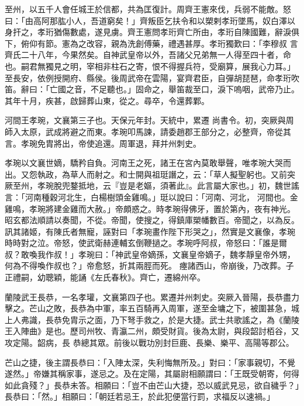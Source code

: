 \begin{pinyinscope}
 至州，以五千人會任城王於信都，共為匡復計。周齊王憲來伐，兵弱不能敵。怒曰：「由高阿那肱小人，吾道窮矣！」齊叛臣乞扶令和以槊剌孝珩墜馬，奴白澤以身扞之，孝珩猶傷數處，遂見虜。齊王憲問孝珩齊亡所由，孝珩自陳國難，辭淚俱下，俯仰有節。憲為之改容，親為洗創傅藥，禮遇甚厚。孝珩獨歎曰：「李穆叔
 言齊氏二十八年，今果然矣。自神武皇帝以外，吾諸父兄弟無一人得至四十者，命也。嗣君無獨見之明，宰相非柱石之寄，恨不得握兵符，受廟算，展我心力耳。」至長安，依例授開府、縣侯。後周武帝在雲陽，宴齊君臣，自彈胡琵琶，命孝珩吹笛。辭曰：「亡國之音，不足聽也。」固命之，舉笛裁至口，淚下嗚咽，武帝乃止。其年十月，疾甚，啟歸葬山東，從之。尋卒，令還葬鄴。



 河間王孝琬，文襄第三子也。天保元年封。天統中，累遷
 尚書令。初，突厥與周師入太原，武成將避之而東。孝琬叩馬諫，請委趙郡王部分之，必整齊，帝從其言。孝琬免胄將出，帝使追還。周軍退，拜并州刺史。



 孝琬以文襄世嫡，驕矜自負。河南王之死，諸王在宮內莫敢舉聲，唯孝琬大哭而出。又怨執政，為草人而射之。和士開與祖珽譖之，云：「草人擬聖躬也。又前突厥至州，孝琬脫兜鍪抵地，云『豈是老嫗，須著此』。此言屬大家也。」初，魏世謠言：「河南種穀河北生，白楊樹頭金雞鳴。」珽以說曰：「河南、河北，
 河間也。金雞鳴，孝琬將建金雞而大赦。」帝頗惑之。時孝琬得佛牙，置於第內，夜有神光。昭玄都法順請以奏聞，不從。帝聞，使搜之，得鎮庫槊幡數百。帝聞之，以為反。訊其諸姬，有陳氏者無寵，誣對曰「孝琬畫作陛下形哭之」，然實是文襄像，孝琬時時對之泣。帝怒，使武衛赫連輔玄倒鞭撾之。孝琬呼阿叔，帝怒曰：「誰是爾叔？敢喚我作叔！」孝琬曰：「神武皇帝嫡孫，文襄皇帝嫡子，魏孝靜皇帝外甥，何為不得喚作叔也？」帝愈怒，折其兩脛而死。
 瘞諸西山，帝崩後，乃改葬。子正禮嗣，幼聰穎，能誦《左氏春秋》。齊亡，遷綿州卒。



 蘭陵武王長恭，一名孝瓘，文襄第四子也。累遷并州刺史。突厥入晉陽，長恭盡力擊之。芒山之敗，長恭為中軍，率五百騎再入周軍，遂至金墉之下，被圍甚急，城上人弗識，長恭免胄示之面，乃下弩手救之，於是大捷。武士共歌謠之，為《蘭陵王入陣曲》是也。歷司州牧、青瀛二州，頗受財貨。後為太尉，與段韶討栢谷，又攻定陽。韶病，長
 恭總其眾。前後以戰功別封巨鹿、長樂、樂平、高陽等郡公。



 芒山之捷，後主謂長恭曰：「入陣太深，失利悔無所及。」對曰：「家事親切，不覺遂然。」帝嫌其稱家事，遂忌之。及在定陽，其屬尉相願謂曰：「王既受朝寄，何得如此貪殘？」長恭未答。相願曰：「豈不由芒山大捷，恐以威武見忌，欲自穢乎？」長恭曰：「然。」相願曰：「朝廷若忌王，於此犯便當行罰，求福反以速禍。」




\end{pinyinscope}
